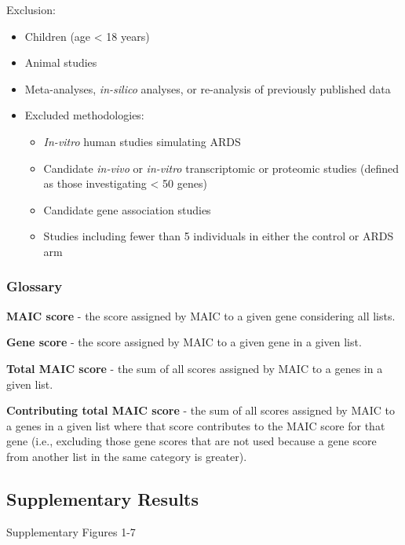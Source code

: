 \documentclass[
  11,
  a4paper,
]{article}
\providecommand{\tightlist}{%
  \setlength{\itemsep}{0pt}\setlength{\parskip}{0pt}}\usepackage{longtable,booktabs,array}
\begin{document}
Exclusion:

\begin{itemize}
\tightlist
\item
  Children (age \textless{} 18 years)
\item
  Animal studies
\item
  Meta-analyses, \emph{in-silico} analyses, or re-analysis of previously
  published data
\item
  Excluded methodologies:

  \begin{itemize}
  \tightlist
  \item
    \emph{In-vitro} human studies simulating ARDS
  \item
    Candidate \emph{in-vivo} or \emph{in-vitro} transcriptomic or
    proteomic studies (defined as those investigating \textless{} 50
    genes)
  \item
    Candidate gene association studies
  \item
    Studies including fewer than 5 individuals in either the control or
    ARDS arm
  \end{itemize}
\end{itemize}

\newpage

\subsubsection{Glossary}\label{glossary}

\textbf{MAIC score} - the score assigned by MAIC to a given gene
considering all lists.

\textbf{Gene score} - the score assigned by MAIC to a given gene in a
given list.

\textbf{Total MAIC score} - the sum of all scores assigned by MAIC to a
genes in a given list.

\textbf{Contributing total MAIC score} - the sum of all scores assigned
by MAIC to a genes in a given list where that score contributes to the
MAIC score for that gene (i.e., excluding those gene scores that are not
used because a gene score from another list in the same category is
greater).

\newpage

\subsection{Supplementary Results}\label{supplementary-results}

Supplementary Figures 1-7
\end{document}
